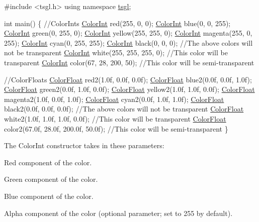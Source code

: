 \begin{DoxyCode}
\textcolor{preprocessor}{#include <tsgl.h>}
\textcolor{keyword}{using namespace }\hyperlink{namespacetsgl}{tsgl};

\textcolor{keywordtype}{int} main() \{
  \textcolor{comment}{//ColorInts}
  \hyperlink{structtsgl_1_1_color_int}{ColorInt} red(255, 0, 0); 
  \hyperlink{structtsgl_1_1_color_int}{ColorInt} blue(0, 0, 255);
  \hyperlink{structtsgl_1_1_color_int}{ColorInt} green(0, 255, 0); 
  \hyperlink{structtsgl_1_1_color_int}{ColorInt} yellow(255, 255, 0);
  \hyperlink{structtsgl_1_1_color_int}{ColorInt} magenta(255, 0, 255);
  \hyperlink{structtsgl_1_1_color_int}{ColorInt} cyan(0, 255, 255);
  \hyperlink{structtsgl_1_1_color_int}{ColorInt} black(0, 0, 0);
  \textcolor{comment}{//The above colors will not be transparent}
  \hyperlink{structtsgl_1_1_color_int}{ColorInt} white(255, 255, 255, 0);  \textcolor{comment}{//This color will be transparent}
  \hyperlink{structtsgl_1_1_color_int}{ColorInt} color(67, 28, 200, 50); \textcolor{comment}{//This color will be semi-transparent  }


  \textcolor{comment}{//ColorFloats}
  \hyperlink{structtsgl_1_1_color_float}{ColorFloat} red2(1.0f, 0.0f, 0.0f); 
  \hyperlink{structtsgl_1_1_color_float}{ColorFloat} blue2(0.0f, 0.0f, 1.0f);
  \hyperlink{structtsgl_1_1_color_float}{ColorFloat} green2(0.0f, 1.0f, 0.0f); 
  \hyperlink{structtsgl_1_1_color_float}{ColorFloat} yellow2(1.0f, 1.0f, 0.0f);
  \hyperlink{structtsgl_1_1_color_float}{ColorFloat} magenta2(1.0f, 0.0f, 1.0f);
  \hyperlink{structtsgl_1_1_color_float}{ColorFloat} cyan2(0.0f, 1.0f, 1.0f);
  \hyperlink{structtsgl_1_1_color_float}{ColorFloat} black2(0.0f, 0.0f, 0.0f);
  \textcolor{comment}{//The above colors will not be transparent}
  \hyperlink{structtsgl_1_1_color_float}{ColorFloat} white2(1.0f, 1.0f, 1.0f, 0.0f); \textcolor{comment}{//This color will be transparent}
  \hyperlink{structtsgl_1_1_color_float}{ColorFloat} color2(67.0f, 28.0f, 200.0f, 50.0f); \textcolor{comment}{//This color will be semi-transparent }
\}
\end{DoxyCode}


The Color\+Int constructor takes in these parameters\+:


\begin{DoxyItemize}
\item Red component of the color.
\item Green component of the color.
\item Blue component of the color.
\item Alpha component of the color (optional parameter; set to 255 by default).
\end{DoxyItemize}

